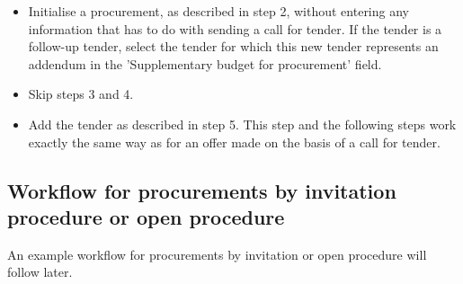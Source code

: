\begin{itemize}
\item
Initialise a procurement, as described in step 2, without entering any information that has to do with sending a call for tender. If the tender is a follow-up tender, select the tender for which this new tender represents an addendum in the 'Supplementary budget for procurement' field.
\item
Skip steps 3 and 4.
\item
Add the tender as described in step 5. This step and the following steps work exactly the same way as for an offer made on the basis of a call for tender.
\end{itemize}

\subsection{Workflow for procurements by invitation procedure or open procedure}

An example workflow for procurements by invitation or open procedure will follow later.
